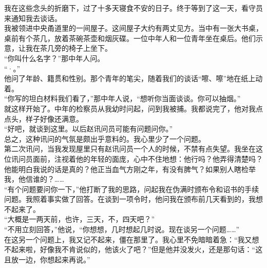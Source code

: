 我在这些念头的折磨下，过了十多天寝食不安的日子。终于等到了这一天，看守员来通知我去谈话。\\

我被领进中央甬道里的一间屋子。这间屋子大约有两丈见方。当中有一张大书桌，桌前有个茶几，放着茶碗茶壶和烟灰碟。一位中年人和一位青年坐在桌后。他们示意，让我在茶几旁的椅子上坐下。\\

“你叫什么名字？”那中年人问。\\

“·。”\\

他问了年龄、籍贯和性别。那个青年的笔尖，随着我们的谈话“嚓、嚓”地在纸上动着。\\

“你写的坦白材料我们看了，”那中年人说，“想听你当面谈谈。你可以抽烟。”\\

就这样开始了。中年的检察员从我幼时问起，问到我被捕。我都说完了，他对我点点头，样子好像还满意。\\

“好吧，就谈到这里。以后赵讯问员可能有问题问你。”\\

总之，这种讯问的气氛是颇出乎意料的。我心里少了一个问题。\\

第二次讯问，当我发现屋里只有赵讯问员一个人的时候，不禁有点失望。我坐在这位讯问员面前，注视着他的年轻的面庞，心中不住地想：他行吗？他弄得清楚吗？他能明白我说的话是真的？他正当血气方刚之年，有没有脾气？如果别人瞎检举我，他信谁的？……\\

“有个问题要问你一下，”他打断了我的思路，问起我在伪满时颁布令和诏书的手续问题。我照着事实做了回答。在谈到一项令时，他问我在颁布前几天看到的，我想不起来了。\\

“大概是一两天前，也许，三天，不，四天吧？”\\

“不用立刻回答，”他说，“你想想，几时想起几时说。现在谈另一个问题……”\\

在这另一个问题上，我又记不起来，僵在那里了。我心里不免暗暗着急：“我又想不起来啦，好像我不肯说似的，他该火了吧？”但是他并没发火，还是那句话：“这且放一边，你想起来再说。”\\

